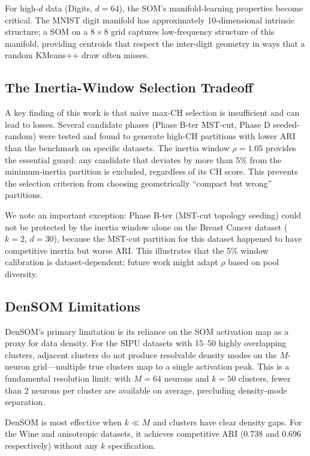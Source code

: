 \documentclass[journal]{IEEEtran}
\begin{document}
For high-$d$ data (Digits, $d=64$), the SOM's manifold-learning properties become critical. The MNIST digit manifold has approximately 10-dimensional intrinsic structure; a SOM on a $8\times8$ grid captures low-frequency structure of this manifold, providing centroids that respect the inter-digit geometry in ways that a random KMeans++ draw often misses.

\subsection{The Inertia-Window Selection Tradeoff}

A key finding of this work is that na{\"i}ve max-CH selection is insufficient and can lead to losses. Several candidate phases (Phase B-ter MST-cut, Phase D seeded-random) were tested and found to generate high-CH partitions with lower ARI than the benchmark on specific datasets. The inertia window $\rho = 1.05$ provides the essential guard: any candidate that deviates by more than 5\% from the minimum-inertia partition is excluded, regardless of its CH score. This prevents the selection criterion from choosing geometrically ``compact but wrong'' partitions.

We note an important exception: Phase B-ter (MST-cut topology seeding) could not be protected by the inertia window alone on the Breast Cancer dataset ($k=2$, $d=30$), because the MST-cut partition for this dataset happened to have competitive inertia but worse ARI. This illustrates that the 5\% window calibration is dataset-dependent; future work might adapt $\rho$ based on pool diversity.

\subsection{DenSOM Limitations}

DenSOM's primary limitation is its reliance on the SOM activation map as a proxy for data density. For the SIPU datasets with 15--50 highly overlapping clusters, adjacent clusters do not produce resolvable density modes on the $M$-neuron grid—multiple true clusters map to a single activation peak. This is a fundamental resolution limit: with $M = 64$ neurons and $k = 50$ clusters, fewer than 2 neurons per cluster are available on average, precluding density-mode separation.

DenSOM is most effective when $k \ll M$ and clusters have clear density gaps. For the Wine and anisotropic datasets, it achieves competitive ARI ($0.738$ and $0.696$ respectively) without any $k$ specification.
\end{document}
